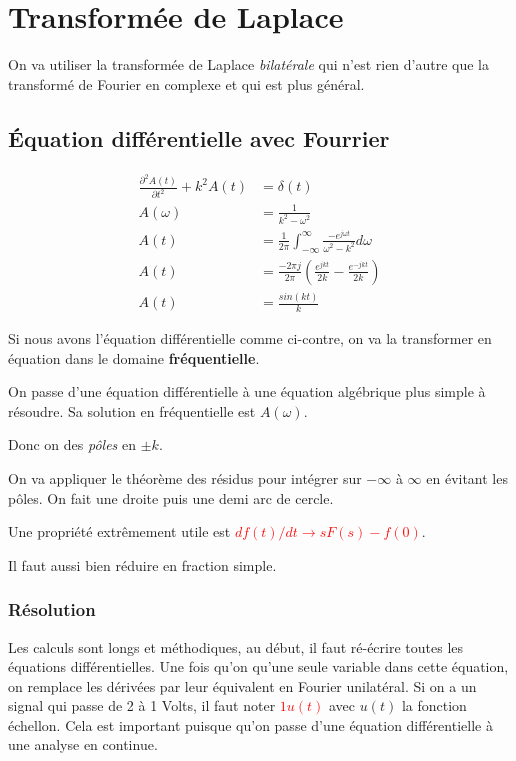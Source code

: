 \documentclass{report}
\begin{document}
\chapter{Transformée de Laplace} \label{Laplace}
On va utiliser la transformée de Laplace \textit{bilatérale} qui n'est rien d'autre que la transformé de Fourier en complexe et qui est plus général.

\section{Équation différentielle avec Fourrier}
\begin{figure}
\centering
\begin{align*}
\frac{\partial^2 A(t)}{\partial t^2} + k^2 A(t) &= \delta (t)\\
A(\omega ) &= \frac{1}{k^2 - \omega^2}\\
A(t) &= \frac{1}{2\pi} \int_{-\infty}^{\infty} \frac{-e^{j \omega t}}{\omega^2 - k^2} d\omega \\
A(t) &= \frac{-2 \pi j}{2\pi} \left( \frac{e^{jkt}}{2k} - \frac{e^{-jkt}}{2k} \right)\\
A(t) &= \frac{sin(kt)}{k}
\end{align*}
\end{figure}
Si nous avons l'équation différentielle comme ci-contre, on va la transformer en équation dans le domaine \textbf{fréquentielle}.\par 
On passe d'une équation différentielle à une équation algébrique plus simple à résoudre. Sa solution en fréquentielle est $A(\omega)$. \par 
Donc on des \textit{pôles} en $\pm k$.\par 
On va appliquer le théorème des résidus pour intégrer sur $- \infty$ à $\infty$ en évitant les pôles. On fait une droite puis une demi arc de cercle.\par 
Une propriété extrêmement utile est \textcolor{red}{$df(t)/dt \rightarrow sF(s) -f(0)$}.\par 
Il faut aussi bien réduire en fraction simple.

\subsection{Résolution}
Les calculs sont longs et méthodiques, au début, il faut ré-écrire toutes les équations différentielles. Une fois qu'on qu'une seule variable dans cette équation, on remplace les dérivées par leur équivalent en Fourier unilatéral. Si on a un signal qui passe de 2 à 1 Volts, il faut noter \textcolor{red}{$1 u(t)$} avec $u(t)$ la fonction échellon. Cela est important puisque qu'on passe d'une équation différentielle à une analyse en continue.
\end{document}
